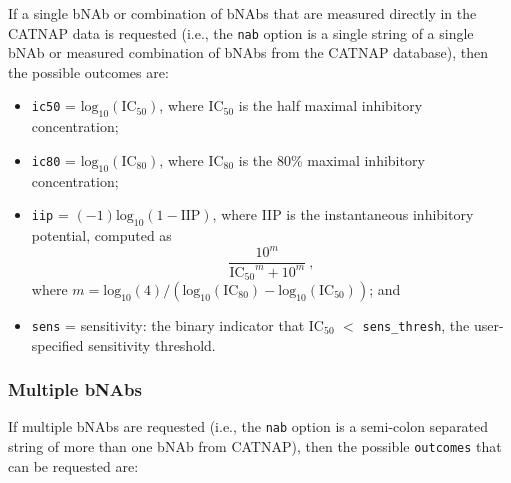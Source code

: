 \documentclass[]{article}
\providecommand{\tightlist}{%
  \setlength{\itemsep}{0pt}\setlength{\parskip}{0pt}}
\begin{document}
If a single bNAb or combination of bNAbs that are measured directly in
the CATNAP data is requested (i.e., the \texttt{nab} option is a single
string of a single bNAb or measured combination of bNAbs from the CATNAP
database), then the possible outcomes are:

\begin{itemize}
\tightlist
\item
  \texttt{ic50} = \(\mbox{log}_{10}(\mbox{IC}_{50})\), where IC\(_{50}\)
  is the half maximal inhibitory concentration;
\item
  \texttt{ic80} = \(\mbox{log}_{10}(\mbox{IC}_{80})\), where IC\(_{80}\)
  is the 80\% maximal inhibitory concentration;
\item
  \texttt{iip} = \((-1)\mbox{log}_{10}(1 - \mbox{IIP})\), where IIP
  \citep[\citet{wagh2016optimal}]{shen2008dose} is the instantaneous
  inhibitory potential, computed as
  \[ \frac{10^m}{\mbox{IC$_{50}$}^m + 10^m} \ , \] where
  \(m = \mbox{log}_{10}(4) / (\mbox{log}_{10}(\mbox{IC}_{80}) - \mbox{log}_{10}(\mbox{IC}_{50}))\);
  and
\item
  \texttt{sens} = sensitivity: the binary indicator that IC\(_{50}\)
  \(<\) \texttt{sens\_thresh}, the user-specified sensitivity threshold.
\end{itemize}

\subsubsection{Multiple bNAbs}\label{multiple-bnabs}

If multiple bNAbs are requested (i.e., the \texttt{nab} option is a
semi-colon separated string of more than one bNAb from CATNAP), then the
possible \texttt{outcomes} that can be requested are:
\end{document}

